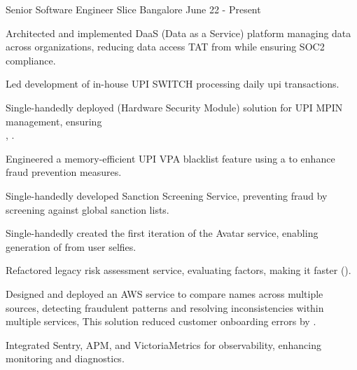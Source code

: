 \begin{cventries}
  \cventry
    {Senior Software Engineer}
    {Slice}
    {Bangalore}
    {June 22 - Present}
    {
      \begin{cvitems}
        \item {Architected and implemented DaaS (Data as a Service) platform managing  data across organizations,
        reducing data access TAT from  while ensuring SOC2 compliance.}
        \item {Led development of in-house UPI SWITCH processing  daily upi transactions.}
        \item {Single-handedly deployed (Hardware Security Module) solution for UPI MPIN management, ensuring 
          \\ ,
        .}
        \item {Engineered a memory-efficient UPI VPA blacklist feature using a  to enhance fraud prevention measures.}
        \item {Single-handedly developed Sanction Screening Service, preventing fraud by screening against  global sanction lists.}
        \item {Single-handedly created the first iteration of the Avatar service, enabling  generation of  from user selfies.}
        \item {Refactored legacy risk assessment service, evaluating  factors, making it  faster ().}
        \item {Designed and deployed an AWS  service to compare names across multiple sources,
          detecting fraudulent patterns and resolving inconsistencies within multiple services, This solution reduced customer onboarding errors by .}
        \item {Integrated Sentry, APM, and VictoriaMetrics for observability, enhancing monitoring and diagnostics.}
      \end{cvitems}
    }
  

\end{cventries}
